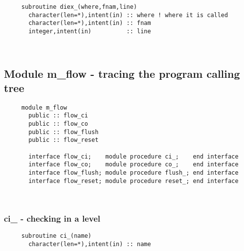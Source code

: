 \begin{verbatim} 
     subroutine diex_(where,fnam,line)
       character(len=*),intent(in) :: where	! where it is called
       character(len=*),intent(in) :: fnam
       integer,intent(in)          :: line
 \end{verbatim}%

 
 
\mbox{}\hrulefill\ 
 
  \subsection{Module m\_flow - tracing the program calling tree }

\begin{verbatim} 
     module m_flow
       public :: flow_ci
       public :: flow_co
       public :: flow_flush
       public :: flow_reset
 
       interface flow_ci;    module procedure ci_;    end interface
       interface flow_co;    module procedure co_;    end interface
       interface flow_flush; module procedure flush_; end interface
       interface flow_reset; module procedure reset_; end interface
 \end{verbatim}%
 
 
\mbox{}\hrulefill\ 
 
  \subsubsection{ci\_ - checking in a level}

\begin{verbatim} 
     subroutine ci_(name)
       character(len=*),intent(in) :: name
 \end{verbatim}%
 
